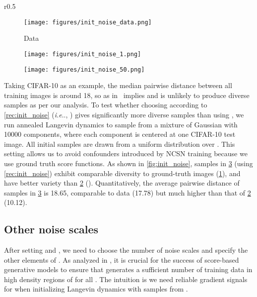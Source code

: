 \documentclass{article}
\makeatletter
\def\@onedot{\ifx\@let@token.\else.\null\fi\xspace}
\DeclareRobustCommand\onedot{\futurelet\@let@token\@onedot}
\def\ie{\emph{i.e}\onedot}
\makeatother
\begin{document}
\begin{wrapfigure}[12]{r}{0.5\textwidth}
    \vspace{-0.5em}
    \centering
    \begin{subfigure}[b]{0.15\textwidth}
        \texttt{[image: figures/init\_noise\_data.png]}
        \caption{Data}\label{fig:init_noise_data}
    \end{subfigure}
    \begin{subfigure}[b]{0.15\textwidth}
        \texttt{[image: figures/init\_noise\_1.png]}
        \caption{}\label{fig:init_noise_1}
    \end{subfigure}
    \begin{subfigure}[b]{0.15\textwidth}
        \texttt{[image: figures/init\_noise\_50.png]}
        \caption{}\label{fig:init_noise_50}
    \end{subfigure}
    \caption{Running annealed Langevin dynamics to sample from a mixture of Gaussian centered at images in the CIFAR-10 test set.}
    \label{fig:init_noise}
\end{wrapfigure}
Taking CIFAR-10 as an example, the median pairwise distance between all training images is around 18, so  as in~\cite{song2019generative} implies  and is unlikely to produce diverse samples as per our analysis. To test whether choosing  according to \cref{rec:init_noise} (\ie, ) gives significantly more diverse samples than using , we run annealed Langevin dynamics to sample from a mixture of Gaussian with 10000 components, where each component is centered at one CIFAR-10 test image. All initial samples are drawn from a uniform distribution over . This setting allows us to avoid confounders introduced by NCSN training because we use ground truth score functions. As shown in \cref{fig:init_noise}, samples in \cref{fig:init_noise_50} (using \cref{rec:init_noise}) exhibit comparable diversity to ground-truth images (\cref{fig:init_noise_data}), and have better variety than \cref{fig:init_noise_1} (). Quantitatively, the average pairwise distance of samples in \cref{fig:init_noise_50} is 18.65, comparable to data (17.78) but much higher than that of \cref{fig:init_noise_1} (10.12).

\subsection{Other noise scales}\label{sec:noise_levels}

After setting  and , we need to choose the number of noise scales  and specify the other elements of . As analyzed in \cite{song2019generative}, it is crucial for the success of score-based generative models to ensure that  generates a sufficient number of training data in high density regions of  for all . The intuition is we need reliable gradient signals for  when initializing Langevin dynamics with samples from . 
\end{document}
